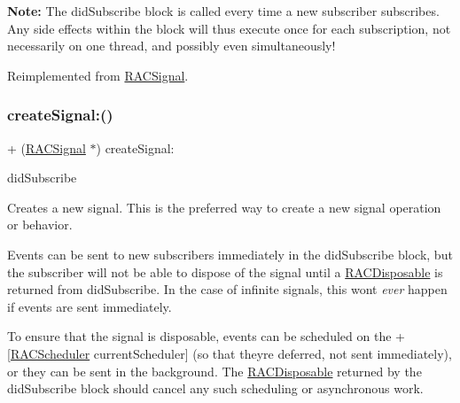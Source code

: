 {\bfseries Note\+:} The {\ttfamily did\+Subscribe} block is called every time a new subscriber subscribes. Any side effects within the block will thus execute once for each subscription, not necessarily on one thread, and possibly even simultaneously! 

Reimplemented from \mbox{\hyperlink{interface_r_a_c_signal_a4ba374f148d6e2a0339c4f4202b4dc26}{R\+A\+C\+Signal}}.

\mbox{\label{interface_r_a_c_dynamic_signal_aeffa754150754dd6296d5225b5c9c7fe}} 
\subsubsection{\texorpdfstring{create\+Signal\+:()}{createSignal:()}\hspace{0.1cm}{\footnotesize\ttfamily [3/3]}}
{\footnotesize\ttfamily + (\mbox{\hyperlink{interface_r_a_c_signal}{R\+A\+C\+Signal}} $\ast$) create\+Signal\+: \begin{DoxyParamCaption}\item[{(\mbox{\hyperlink{interface_r_a_c_disposable}{R\+A\+C\+Disposable}} $\ast$($^\wedge$)(id$<$\mbox{\hyperlink{interface_r_a_c_subscriber}{R\+A\+C\+Subscriber}}$>$ subscriber))}]{did\+Subscribe }\end{DoxyParamCaption}}

Creates a new signal. This is the preferred way to create a new signal operation or behavior.

Events can be sent to new subscribers immediately in the {\ttfamily did\+Subscribe} block, but the subscriber will not be able to dispose of the signal until a \mbox{\hyperlink{interface_r_a_c_disposable}{R\+A\+C\+Disposable}} is returned from {\ttfamily did\+Subscribe}. In the case of infinite signals, this won\textquotesingle{}t {\itshape ever} happen if events are sent immediately.

To ensure that the signal is disposable, events can be scheduled on the +\mbox{[}\mbox{\hyperlink{interface_r_a_c_scheduler}{R\+A\+C\+Scheduler}} current\+Scheduler\mbox{]} (so that they\textquotesingle{}re deferred, not sent immediately), or they can be sent in the background. The \mbox{\hyperlink{interface_r_a_c_disposable}{R\+A\+C\+Disposable}} returned by the {\ttfamily did\+Subscribe} block should cancel any such scheduling or asynchronous work.

